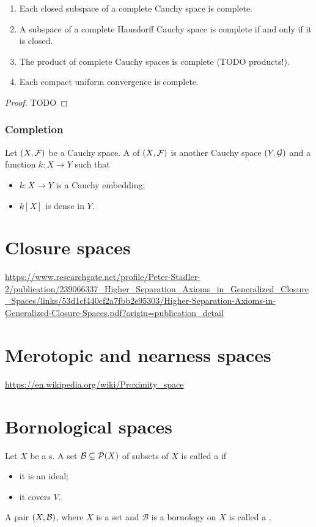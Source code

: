 \begin{proposition}
\begin{enumerate}
\item Each closed subspace of a complete Cauchy space is complete.
\item A subspace of a complete Hausdorff Cauchy space is complete \textup{if and only if} it is closed.
\item The product of complete Cauchy spaces is complete (TODO products!).
\item Each compact uniform convergence is complete.
\end{enumerate}
\end{proposition}
\begin{proof}
TODO
\end{proof}

\subsubsection{Completion}
\begin{definition}
Let $\left( X, \mathcal{F} \right)$ be a Cauchy space. A  of $\left( X, \mathcal{F} \right)$ is another Cauchy space $\left( Y, \mathcal{G} \right)$ and a function $k: X\to Y$ such that
\begin{itemize}
\item $k: X\to Y$ is a Cauchy embedding;
\item $k[X]$ is dense in $Y$.
\end{itemize}
\end{definition}

\section{Closure spaces}
\url{https://www.researchgate.net/profile/Peter-Stadler-2/publication/239066337_Higher_Separation_Axioms_in_Generalized_Closure_Spaces/links/53d1cf440cf2a7fbb2e95303/Higher-Separation-Axioms-in-Generalized-Closure-Spaces.pdf?origin=publication_detail}

\section{Merotopic and nearness spaces}
\url{https://en.wikipedia.org/wiki/Proximity_space}

\section{Bornological spaces}
\begin{definition}
Let $X$ be a s. A set $\mathcal{B}\subseteq \operatorname{\mathcal{P}}(X)$ of subsets of $X$ is called a  if
\begin{itemize}
\item it is an ideal;
\item it covers $V$.
\end{itemize}
A pair $\left( X,\mathcal{B} \right)$, where $X$ is a set and $\mathcal{B}$ is a bornology on $X$ is called a .
\end{definition}

